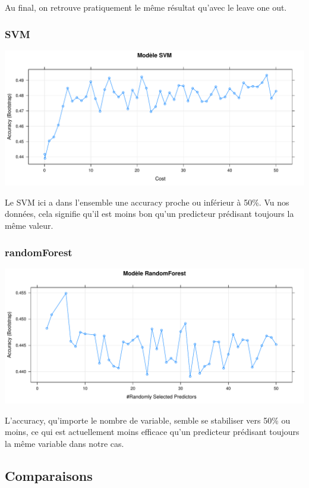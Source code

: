 \documentclass[]{article}
\begin{document}
Au final, on retrouve pratiquement le même résultat qu'avec le leave one
out.

\hypertarget{svm-2}{%
\subsubsection{SVM}\label{svm-2}}

\includegraphics{repport_projet_files/figure-latex/unnamed-chunk-53-1.pdf}

Le SVM ici a dans l'ensemble une accuracy proche ou inférieur à 50\%. Vu
nos données, cela signifie qu'il est moins bon qu'un predicteur
prédisant toujours la même valeur.

\hypertarget{randomforest-1}{%
\subsubsection{randomForest}\label{randomforest-1}}

\includegraphics{repport_projet_files/figure-latex/unnamed-chunk-54-1.pdf}

L'accuracy, qu'importe le nombre de variable, semble se stabiliser vers
50\% ou moins, ce qui est actuellement moins efficace qu'un predicteur
prédisant toujours la même variable dans notre cas.

\hypertarget{comparaisons}{%
\subsection{Comparaisons}\label{comparaisons}}
\end{document}
